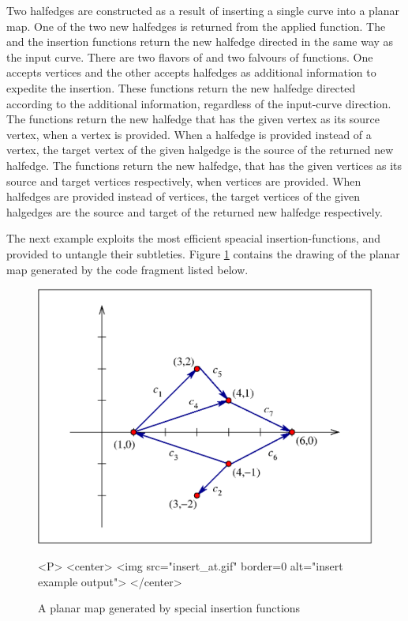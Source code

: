 Two halfedges are constructed as a result of inserting a single curve into a
planar map. One of the two new halfedges is returned from the applied function.
The  and the  insertion functions
return the new halfedge directed in the same way as the input curve. There are
two flavors of  and two falvours of
 functions. One accepts vertices and the other
accepts halfedges as additional information to expedite the insertion. These
functions return the new halfedge directed according to the additional
information, regardless of the input-curve direction. The
 functions return the new halfedge that has the given
vertex as its source vertex, when a vertex is provided. When a halfedge is
provided instead of a vertex, the target vertex of the given halgedge is the
source of the returned new halfedge. The  functions
return the new halfedge, that has the given vertices as its source and target
vertices respectively, when vertices are provided. When halfedges are provided
instead of vertices, the target vertices of the given halgedges are the source
and target of the returned new halfedge respectively.

The next example exploits the most efficient speacial insertion-functions, and
provided to untangle their subtleties. Figure \ref{PM_sec:insert_at} contains
the drawing of the planar map generated by the code fragment listed below.

\begin{figure}[h]
\begin{ccTexOnly}
\centerline{\includegraphics{insert_at.ps}}
\end{ccTexOnly}

\caption{A planar map generated by special insertion functions
\label{PM_sec:insert_at}}

\begin{ccHtmlOnly}
<P>
<center>
  <img src="insert_at.gif"  border=0 alt="insert example output">
</center>
\end{ccHtmlOnly}
\end{figure}

